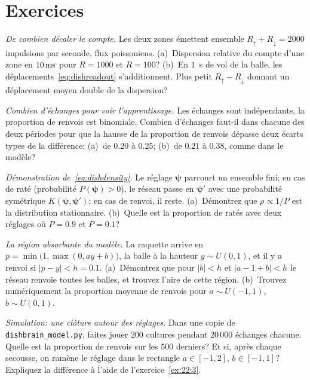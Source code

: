 \section{Exercices}

\begin{exercise}[\lvlA]
\label{ex:22:1}
\emph{De combien décaler le compte.} Les deux zones émettent ensemble $R_\uparrow+R_\downarrow=2000$ impulsions par seconde, flux poissoniens. (a)~Dispersion relative du compte d'une zone en $10\,\text{ms}$ pour $R=1000$ et $R=100$? (b)~En $1$~s de vol de la balle, les déplacements~\eqref{eq:dishreadout} s'additionnent. Plus petit $R_\uparrow-R_\downarrow$ donnant un déplacement moyen double de la dispersion?
\end{exercise}

\begin{exercise}[\lvlA]
\label{ex:22:2}
\emph{Combien d'échanges pour voir l'apprentissage.} Les échanges sont indépendants, la proportion de renvois est binomiale. Combien d'échanges faut-il dans chacune des deux périodes pour que la hausse de la proportion de renvois dépasse deux écarts types de la différence: (a)~de $0.20$ à $0.25$; (b)~de $0.21$ à $0.38$, comme dans le modèle?
\end{exercise}

\begin{exercise}[\lvlB]
\label{ex:22:3}
\emph{Démonstration de~\eqref{eq:dishdensity}.} Le réglage $\boldsymbol\psi$ parcourt un ensemble fini; en cas de raté (probabilité $P(\boldsymbol\psi)>0$), le réseau passe en $\boldsymbol\psi'$ avec une probabilité symétrique $K(\boldsymbol\psi,\boldsymbol\psi')$; en cas de renvoi, il reste. (a)~Démontrez que $\rho\propto1/P$ est la distribution stationnaire. (b)~Quelle est la proportion de ratés avec deux réglages où $P=0.9$ et $P=0.1$?
\end{exercise}

\begin{exercise}[\lvlB]
\label{ex:22:4}
\emph{La région absorbante du modèle.} La raquette arrive en $p=\min\bigl(1,\max(0,ay+b)\bigr)$, la balle à la hauteur $y\sim U(0,1)$, et il y a renvoi si $|p-y|<h=0.1$. (a)~Démontrez que pour $|b|<h$ et $|a-1+b|<h$ le réseau renvoie toutes les balles, et trouvez l'aire de cette région. (b)~Trouvez numériquement la proportion moyenne de renvois pour $a\sim U(-1,1)$, $b\sim U(0,1)$.
\end{exercise}

\begin{exercise}[\lvlB]
\label{ex:22:5}
\emph{Simulation: une clôture autour des réglages.} Dans une copie de \texttt{dishbrain\_model.py}, faites jouer $200$ cultures pendant $20\,000$ échanges chacune. Quelle est la proportion de renvois sur les $500$ derniers? Et si, après chaque secousse, on ramène le réglage dans le rectangle $a\in[-1,2]$, $b\in[-1,1]$? Expliquez la différence à l'aide de l'exercice~\ref{ex:22:3}.
\end{exercise}

